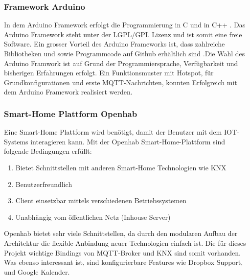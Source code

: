\subsubsection{Framework Arduino}
In dem Arduino Framework erfolgt die Programmierung in C und in C++ . Das Arduino Framework steht unter der LGPL/GPL Lizenz und ist somit eine freie Software. Ein grosser Vorteil des Arduino Frameworks ist, dass zahlreiche Bibliotheken und sowie Programmcode auf  Github erhältlich sind \cite{noauthor_arduino_nodate}.Die Wahl des Arduino Framwork ist auf Grund der Programmiersprache, Verfügbarkeit und bisherigen Erfahrungen erfolgt. Ein Funktionsmuster mit Hotspot, für Grundkonfigurationen und erste MQTT-Nachrichten, konnten Erfolgreich mit dem Arduino Framework realisiert werden.

\subsubsection{Smart-Home Plattform Openhab}
\label{subsubsec: Smart-Home Plattform}
Eine Smart-Home Plattform wird benötigt, damit der Benutzer mit dem IOT-Systems interagieren kann. 
Mit der Openhab Smart-Home-Plattform sind folgende Bedingungen erfüllt:\\
\begin{enumerate}
	\item Bietet Schnittstellen mit anderen Smart-Home Technologien wie KNX
	\item Benutzerfreundlich
	\item Client einsetzbar mittels verschiedenen Betriebssystemen
	\item Unabhängig vom öffentlichen Netz (Inhouse Server) 
\end{enumerate}
Openhab bietet sehr viele Schnittstellen, da durch den modularen Aufbau der Architektur die flexible Anbindung neuer Technologien einfach ist. Die für dieses Projekt wichtige Bindings von MQTT-Broker und KNX sind somit vorhanden. Was ebenso interessant ist, sind konfigurierbare Features wie Dropbox Support, und Google Kalender.